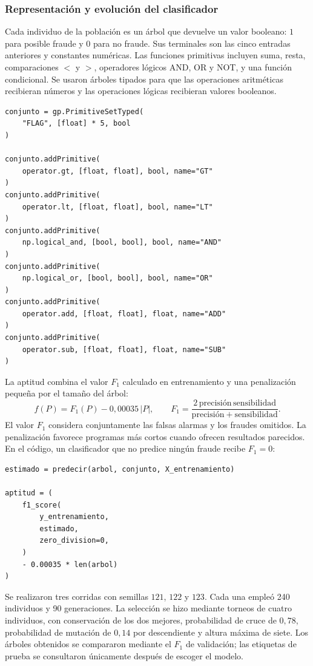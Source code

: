 \documentclass[14pt,twoside]{article}
\begin{document}
\subsubsection{Representación y evolución del clasificador}

Cada individuo de la población es un árbol que devuelve un valor booleano: \(1\) para posible fraude y \(0\) para no fraude. Sus terminales son las cinco entradas anteriores y constantes numéricas. Las funciones primitivas incluyen suma, resta, comparaciones \(<\) y \(>\), operadores lógicos AND, OR y NOT, y una función condicional. Se usaron árboles tipados para que las operaciones aritméticas recibieran números y las operaciones lógicas recibieran valores booleanos.

\begin{lstlisting}[style=pgpython,caption={Algunas funciones primitivas del clasificador.}]
conjunto = gp.PrimitiveSetTyped(
    "FLAG", [float] * 5, bool
)

conjunto.addPrimitive(
    operator.gt, [float, float], bool, name="GT"
)
conjunto.addPrimitive(
    operator.lt, [float, float], bool, name="LT"
)
conjunto.addPrimitive(
    np.logical_and, [bool, bool], bool, name="AND"
)
conjunto.addPrimitive(
    np.logical_or, [bool, bool], bool, name="OR"
)
conjunto.addPrimitive(
    operator.add, [float, float], float, name="ADD"
)
conjunto.addPrimitive(
    operator.sub, [float, float], float, name="SUB"
)
\end{lstlisting}

La aptitud combina el valor \(F_1\) calculado en entrenamiento y una penalización pequeña por el tamaño del árbol:
\[
f(P)=F_1(P)-0{,}00035\,|P|,
\qquad
F_1=\frac{2\,\mathrm{precisión}\,\mathrm{sensibilidad}}
{\mathrm{precisión}+\mathrm{sensibilidad}}.
\]
El valor \(F_1\) considera conjuntamente las falsas alarmas y los fraudes omitidos. La penalización favorece programas más cortos cuando ofrecen resultados parecidos. En el código, un clasificador que no predice ningún fraude recibe \(F_1=0\):

\begin{lstlisting}[style=pgpython,caption={Función de aptitud utilizada durante la evolución.}]
estimado = predecir(arbol, conjunto, X_entrenamiento)

aptitud = (
    f1_score(
        y_entrenamiento,
        estimado,
        zero_division=0,
    )
    - 0.00035 * len(arbol)
)
\end{lstlisting}

Se realizaron tres corridas con semillas \(121\), \(122\) y \(123\). Cada una empleó 240 individuos y 90 generaciones. La selección se hizo mediante torneos de cuatro individuos, con conservación de los dos mejores, probabilidad de cruce de \(0{,}78\), probabilidad de mutación de \(0{,}14\) por descendiente y altura máxima de siete. Los árboles obtenidos se compararon mediante el \(F_1\) de validación; las etiquetas de prueba se consultaron únicamente después de escoger el modelo.
\end{document}
